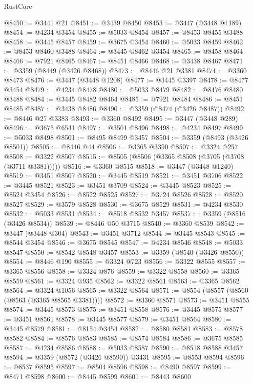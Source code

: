 \begin{lexlean}{RustCore}
\begin{coremodule}
@8450 := @3441 @21
@8451 := @3439 @8450
@8453 := @3447 (@3448 @1189)
@8454 := @4234 @3454
@8455 := @5033 @8454
@8457 := @8453 @8455 @3488
@8458 := @3445 @8457
@8459 := @3675 @3454
@8460 := @5033 @8459
@8462 := @8453 @8460 @3488
@8464 := @3445 @8462 @3454
@8465 := @8458 @8464
@8466 := @7921 @8465
@8467 := @8451 @8466
@8468 := @3438 @8467
@8471 := @3359 (@8449 (@3426 @8468))
@8473 := @8446 @21 @3381
@8474 := @3360 @8473
@8476 := @3447 (@3448 @1208)
@8477 := @3445 @3397
@8478 := @8477 @3454
@8479 := @4234 @8478
@8480 := @5033 @8479
@8482 := @8476 @8480 @3488
@8484 := @3445 @8482 @8464
@8485 := @7921 @8484
@8486 := @8451 @8485
@8487 := @3438 @8486
@8490 := @3359 (@8474 (@3426 @8487))
@8492 := @8446 @27 @3383
@8493 := @3360 @8492
@8495 := @3447 (@3448 @289)
@8496 := @3675 @6541
@8497 := @3501 @8496
@8498 := @4234 @8497
@8499 := @5033 @8498
@8501 := @8495 @8499 @3457
@8504 := @3359 (@8493 (@3426 @8501))
@8505 := @8446 @44
@8506 := @3365 @3390
@8507 := @3324 @257
@8508 := @3322 @8507
@8515 := @8505 (@8506 (@3365 @8508 (@3705 (@3708 (@3711 @3381)))))
@8516 := @3360 @8515
@8518 := @3447 (@3448 @1240)
@8519 := @3451 @8507
@8520 := @3445 @8519
@8521 := @3451 @3706
@8522 := @3445 @8521
@8523 := @3451 @3709
@8524 := @3445 @8523
@8525 := @8524 @3454
@8526 := @8522 @8525
@8527 := @3724 @8526
@8528 := @8520 @8527
@8529 := @3579 @8528
@8530 := @3675 @8529
@8531 := @4234 @8530
@8532 := @5033 @8531
@8534 := @8518 @8532 @3457
@8537 := @3359 (@8516 (@3426 @8534))
@8539 := @8446 @50 @3715
@8540 := @3360 @8539
@8542 := @3447 (@3448 @304)
@8543 := @3451 @3712
@8544 := @3445 @8543
@8545 := @8544 @3454
@8546 := @3675 @8545
@8547 := @4234 @8546
@8548 := @5033 @8547
@8550 := @8542 @8548 @3457
@8553 := @3359 (@8540 (@3426 @8550))
@8554 := @8446 @190
@8555 := @3324 @723
@8556 := @3322 @8555
@8557 := @3365 @8556
@8558 := @3324 @876
@8559 := @3322 @8558
@8560 := @3365 @8559
@8561 := @3324 @935
@8562 := @3322 @8561
@8563 := @3365 @8562
@8564 := @3324 @1056
@8565 := @3322 @8564
@8571 := @8554 (@8557 (@8560 (@8563 (@3365 @8565 @3381))))
@8572 := @3360 @8571
@8573 := @3451 @8555
@8574 := @3445 @8573
@8575 := @3451 @8558
@8576 := @3445 @8575
@8577 := @3451 @8561
@8578 := @3445 @8577
@8579 := @3451 @8564
@8580 := @3445 @8579
@8581 := @8154 @3454
@8582 := @8580 @8581
@8583 := @8578 @8582
@8584 := @8576 @8583
@8585 := @8574 @8584
@8586 := @3675 @8585
@8587 := @4234 @8586
@8588 := @5033 @8587
@8590 := @8518 @8588 @3457
@8594 := @3359 (@8572 (@3426 @8590)) @3431
@8595 := @8553 @8594
@8596 := @8537 @8595
@8597 := @8504 @8596
@8598 := @8490 @8597
@8599 := @8471 @8598
@8600 := @8445 @8599
@8601 := @8443 @8600

\end{coremodule}
\end{lexlean}
